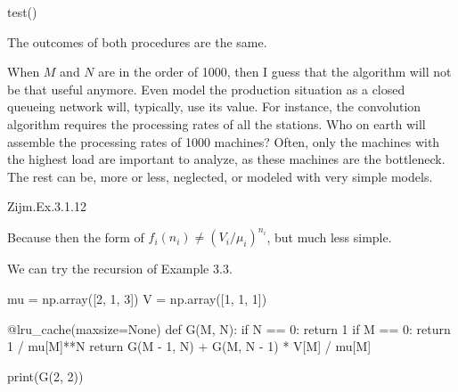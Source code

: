 \begin{exercise}
\begin{solution}
\begin{pyconsole}
test()
 
\end{pyconsole}

The outcomes of both procedures are the same. 

When $M$ and $N$ are in the order of 1000, then I guess that the
algorithm will not be that useful anymore. Even model the production
situation as a closed queueing network will, typically, use its
value. For instance, the convolution algorithm requires the processing
rates of all the stations. Who on earth will assemble the processing
rates of 1000 machines? Often, only the machines with the highest load
are important to analyze, as these machines are the bottleneck. The
rest can be, more or less, neglected, or modeled with very simple
models.

\end{solution}
\end{exercise}

\begin{exercise}
Zijm.Ex.3.1.12
\begin{solution}
 Because then the form of $f_i(n_i)\neq (V_i/\mu_i)^{n_i}$, but much
 less simple.

We can try the recursion of Example 3.3.

\begin{pyconsole}
mu = np.array([2, 1, 3])
V = np.array([1, 1, 1])


@lru_cache(maxsize=None)
def G(M, N):
 if N == 0:
 return 1
 if M == 0:
 return 1 / mu[M]**N
 return G(M - 1, N) + G(M, N - 1) * V[M] / mu[M]

print(G(2, 2))
 
\end{pyconsole}
\end{solution}
\end{exercise}








